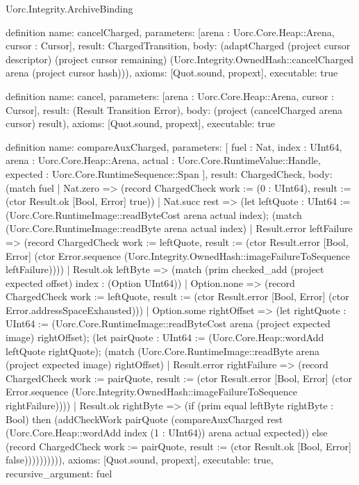 \begin{lexlean}{Uorc.Integrity.ArchiveBinding}
\begin{semanticmodule}
definition{
  name: cancelCharged,
  parameters: [arena : Uorc.Core.Heap::Arena, cursor : Cursor],
  result: ChargedTransition,
  body: (adaptCharged (project cursor descriptor) (project cursor remaining) (Uorc.Integrity.OwnedHash::cancelCharged arena (project cursor hash))),
  axioms: [Quot.sound, propext],
  executable: true
}

definition{
  name: cancel,
  parameters: [arena : Uorc.Core.Heap::Arena, cursor : Cursor],
  result: (Result Transition Error),
  body: (project (cancelCharged arena cursor) result),
  axioms: [Quot.sound, propext],
  executable: true
}

definition{
  name: compareAuxCharged,
  parameters: [
    fuel : Nat,
    index : UInt64,
    arena : Uorc.Core.Heap::Arena,
    actual : Uorc.Core.RuntimeValue::Handle,
    expected : Uorc.Core.RuntimeSequence::Span
  ],
  result: ChargedCheck,
  body: (match fuel
    | Nat.zero => (record ChargedCheck {work := (0 : UInt64), result := (ctor Result.ok [Bool, Error] true)})
    | Nat.succ rest => (let leftQuote : UInt64 := (Uorc.Core.RuntimeImage::readByteCost arena actual index); (match (Uorc.Core.RuntimeImage::readByte arena actual index)
      | Result.error leftFailure => (record ChargedCheck {work := leftQuote, result := (ctor Result.error [Bool, Error] (ctor Error.sequence (Uorc.Integrity.OwnedHash::imageFailureToSequence leftFailure)))})
      | Result.ok leftByte => (match (prim checked_add (project expected offset) index : (Option UInt64))
        | Option.none => (record ChargedCheck {work := leftQuote, result := (ctor Result.error [Bool, Error] (ctor Error.addressSpaceExhausted))})
        | Option.some rightOffset => (let rightQuote : UInt64 := (Uorc.Core.RuntimeImage::readByteCost arena (project expected image) rightOffset); (let pairQuote : UInt64 := (Uorc.Core.Heap::wordAdd leftQuote rightQuote); (match (Uorc.Core.RuntimeImage::readByte arena (project expected image) rightOffset)
          | Result.error rightFailure => (record ChargedCheck {work := pairQuote, result := (ctor Result.error [Bool, Error] (ctor Error.sequence (Uorc.Integrity.OwnedHash::imageFailureToSequence rightFailure)))})
          | Result.ok rightByte => (if (prim equal leftByte rightByte : Bool) then (addCheckWork pairQuote (compareAuxCharged rest (Uorc.Core.Heap::wordAdd index (1 : UInt64)) arena actual expected)) else (record ChargedCheck {work := pairQuote, result := (ctor Result.ok [Bool, Error] false)}))))))))),
  axioms: [Quot.sound, propext],
  executable: true,
  recursive_argument: fuel
}


\end{semanticmodule}
\end{lexlean}
